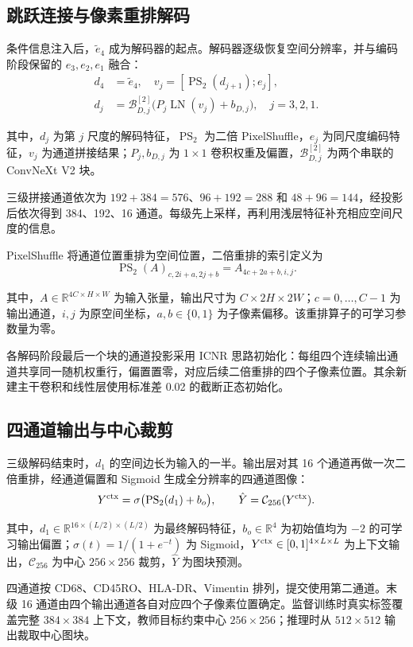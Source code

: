 \documentclass[UTF8,a4paper,zihao=5,fontset=fandol]{ctexart}
\newcommand{\op}[1]{\operatorname{#1}}
\newcommand{\sym}[1]{\par\nobreak\noindent\begin{minipage}{\linewidth}#1\end{minipage}\par}
\begin{document}
\subsection{跳跃连接与像素重排解码}
条件信息注入后，$\widetilde e_4$ 成为解码器的起点。解码器逐级恢复空间分辨率，并与编码阶段保留的 $e_3,e_2,e_1$ 融合：
\begin{equation}
\begin{aligned}
d_4&=\widetilde e_4,\quad
v_j=[\op{PS}_2(d_{j+1});e_j],\\
d_j&=\mathcal B_{D,j}^{[2]}\bigl(P_j\op{LN}(v_j)+b_{D,j}\bigr),
\quad j=3,2,1.
\end{aligned}
\label{eq:decoder}
\end{equation}
\sym{其中，$d_j$ 为第 $j$ 尺度的解码特征，$\op{PS}_2$ 为二倍 PixelShuffle，$e_j$ 为同尺度编码特征，$v_j$ 为通道拼接结果；$P_j,b_{D,j}$ 为 $1\times1$ 卷积权重及偏置，$\mathcal B_{D,j}^{[2]}$ 为两个串联的 ConvNeXt V2 块。}
三级拼接通道依次为 $192+384=576$、$96+192=288$ 和 $48+96=144$，经投影后依次得到 384、192、16 通道。每级先上采样，再利用浅层特征补充相应空间尺度的信息。

PixelShuffle 将通道位置重排为空间位置\cite{espcn}，二倍重排的索引定义为
\begin{equation}
\op{PS}_2(A)_{c,2i+a,2j+b}=A_{4c+2a+b,i,j}.
\label{eq:ps}
\end{equation}
\sym{其中，$A\in\mathbb R^{4C\times H\times W}$ 为输入张量，输出尺寸为 $C\times2H\times2W$；$c=0,\ldots,C-1$ 为输出通道，$i,j$ 为原空间坐标，$a,b\in\{0,1\}$ 为子像素偏移。该重排算子的可学习参数量为零。}
各解码阶段最后一个块的通道投影采用 ICNR 思路\cite{icnr}初始化：每组四个连续输出通道共享同一随机权重行，偏置置零，对应后续二倍重排的四个子像素位置。其余新建主干卷积和线性层使用标准差 0.02 的截断正态初始化。

\subsection{四通道输出与中心裁剪}
三级解码结束时，$d_1$ 的空间边长为输入的一半。输出层对其 16 个通道再做一次二倍重排，经通道偏置和 Sigmoid 生成全分辨率的四通道图像：
\begin{equation}
Y^{\rm ctx}=\sigma\bigl(\op{PS}_2(d_1)+b_o\bigr),\qquad
\hat Y=\mathcal C_{256}(Y^{\rm ctx}).
\label{eq:output}
\end{equation}
\sym{其中，$d_1\in\mathbb R^{16\times(L/2)\times(L/2)}$ 为最终解码特征，$b_o\in\mathbb R^4$ 为初始值均为 $-2$ 的可学习输出偏置；$\sigma(t)=1/(1+e^{-t})$ 为 Sigmoid，$Y^{\rm ctx}\in[0,1]^{4\times L\times L}$ 为上下文输出，$\mathcal C_{256}$ 为中心 $256\times256$ 裁剪，$\hat Y$ 为图块预测。}
四通道按 CD68、CD45RO、HLA-DR、Vimentin 排列，提交使用第二通道。末级 16 通道由四个输出通道各自对应四个子像素位置确定。监督训练时真实标签覆盖完整 $384\times384$ 上下文，教师目标约束中心 $256\times256$；推理时从 $512\times512$ 输出裁取中心图块。
\end{document}

